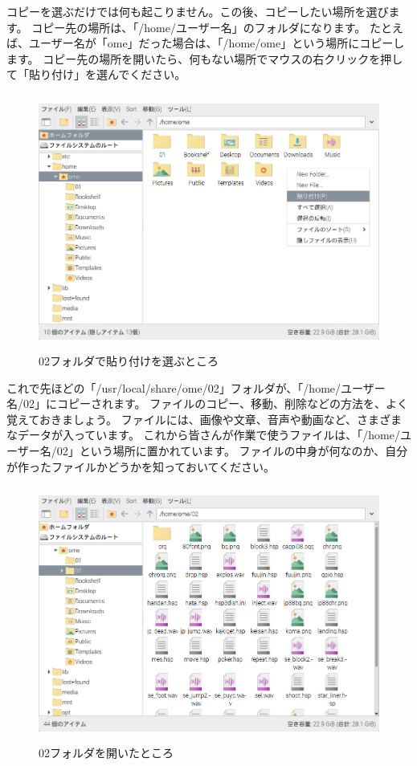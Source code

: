 \noindent
コピーを選ぶだけでは何も起こりません。この後、コピーしたい場所を選びます。
コピー先の場所は、「/home/ユーザー名」のフォルダになります。
たとえば、ユーザー名が「ome」だった場合は、「/home/ome」という場所にコピーします。
コピー先の場所を開いたら、何もない場所でマウスの右クリックを押して「貼り付け」を選んでください。

\begin{figure}[H]
  \begin{center}
    \includegraphics[keepaspectratio,width=11.232cm,height=8.424cm]{images/chap02/s_ome02c.png}
    \caption{02フォルダで貼り付けを選ぶところ}
  \end{center}
  \label{fig:folder_02paste}
\end{figure}

\noindent
これで先ほどの「/usr/local/share/ome/02」フォルダが、「/home/ユーザー名/02」にコピーされます。
ファイルのコピー、移動、削除などの方法を、よく覚えておきましょう。
ファイルには、画像や文章、音声や動画など、さまざまなデータが入っています。
これから皆さんが作業で使うファイルは、「/home/ユーザー名/02」という場所に置かれています。
ファイルの中身が何なのか、自分が作ったファイルかどうかを知っておいてください。

\begin{figure}[H]
  \begin{center}
    \includegraphics[keepaspectratio,width=11.232cm,height=8.424cm]{images/chap02/s_ome02d.png}
    \caption{02フォルダを開いたところ}
  \end{center}
  \label{fig:folder_02open}
\end{figure}
\clearpage


